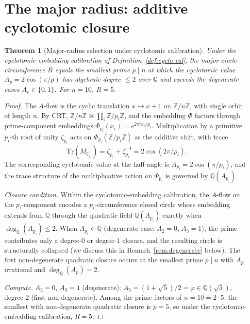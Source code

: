 \documentclass[11pt,reqno]{amsart}
\theoremstyle{plain}
\newtheorem{theorem}{Theorem}
\theoremstyle{definition}
\newcommand{\Z}{\mathbb{Z}}
\newcommand{\Q}{\mathbb{Q}}
\newcommand{\Zn}{\Z/n\Z}
\begin{document}
\section{The major radius: additive cyclotomic closure} \label{sec:R-major}

\begin{theorem}[Major-radius selection under cyclotomic calibration] \label{thm:R-forced}
Under the cyclotomic-embedding calibration of Definition~\ref{def:cyclo-cal}, the major-circle circumference $R$ equals the smallest prime $p \mid n$ at which the cyclotomic value $A_p = 2\cos(\pi/p)$ has algebraic degree $\leq 2$ over $\Q$ and exceeds the degenerate cases $A_p \in \{0, 1\}$. For $n = 10$, $R = 5$.
\end{theorem}

\begin{proof}
The $A$-flow is the cyclic translation $x \mapsto x+1$ on $\Zn$, with single orbit of length $n$. By CRT, $\Zn \cong \prod_i \Z/p_i\Z$, and the embedding $\Phi$ factors through prime-component embeddings $\Phi_{p_i}(x_i) = e^{2 \pi i x_i / p_i}$. Multiplication by a primitive $p_i$-th root of unity $\zeta_{p_i}$ acts on $\Phi_{p_i}(\Z/p_i\Z)$ as the additive shift, with trace
\[
\mathrm{Tr}(M_{\zeta_{p_i}}) = \zeta_{p_i} + \zeta_{p_i}^{-1} = 2 \cos(2\pi/p_i).
\]
The corresponding cyclotomic value at the half-angle is $A_{p_i} = 2 \cos(\pi/p_i)$, and the trace structure of the multiplicative action on $\Phi_{p_i}$ is governed by $\Q(A_{p_i})$.

\emph{Closure condition.} Within the cyclotomic-embedding calibration, the $A$-flow on the $p_i$-component encodes a $p_i$-circumference closed circle whose embedding extends from $\Q$ through the quadratic field $\Q(A_{p_i})$ exactly when $\deg_{\Q}(A_{p_i}) \le 2$. When $A_{p_i} \in \Q$ (degenerate case: $A_2 = 0$, $A_3 = 1$), the prime contributes only a degree-$0$ or degree-$1$ closure, and the resulting circle is structurally collapsed (we discuss this in Remark~\ref{rem:degenerate} below). The first non-degenerate quadratic closure occurs at the smallest prime $p \mid n$ with $A_p$ irrational and $\deg_{\Q}(A_p) = 2$.

\emph{Compute.} $A_2 = 0$, $A_3 = 1$ (degenerate); $A_5 = (1+\sqrt{5})/2 = \varphi \in \Q(\sqrt{5})$, degree $2$ (first non-degenerate). Among the prime factors of $n = 10 = 2 \cdot 5$, the smallest with non-degenerate quadratic closure is $p = 5$, so under the cyclotomic-embedding calibration, $R = 5$.
\end{proof}
\end{document}
